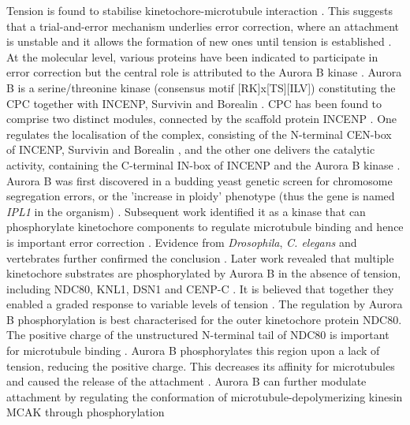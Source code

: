 Tension is found to stabilise kinetochore-microtubule interaction \citep{Nicklas1969CHROMOSOMEChromosomes}. This suggests that a trial-and-error mechanism underlies error correction, where an attachment is unstable and it allows the formation of new ones until tension is established \citep{Nicklas1997HowChromosomes, Tanaka2010Kinetochore-microtubuleBi-orientation, Krenn2015TheSignaling}. At the molecular level, various proteins have been indicated to participate in error correction \citep{Tanaka2022SWAPCorrection} but the central role is attributed to the Aurora B kinase \citep{Krenn2015TheSignaling, Lampson2011SensingFunction, McVey2021AuroraSegregation, Hindriksen2017TheLocalization}. Aurora B is a serine/threonine kinase (consensus motif [RK]x[TS][ILV]) \citep{Cheeseman2002Phospho-regulationIpl1p, Francisco1994TypeSegregation} constituting the CPC together with INCENP, Survivin and Borealin \citep{Gassmann2004BorealinSpindle, Romano2003CSC-1ICP-1, Cooke1987TheMitosis.}. CPC has been found to comprise two distinct modules, connected by the scaffold protein INCENP \citep{Carmena2012TheMitosis}. One regulates the localisation of the complex, consisting of the N-terminal CEN-box of INCENP, Survivin and Borealin \citep{Jeyaprakash2011StructuralComplex, Jeyaprakash2007StructureTogether}, and the other one delivers the catalytic activity, containing the C-terminal IN-box of INCENP and the Aurora B kinase \citep{Kang2001FunctionalSegregation, Bishop2002PhosphorylationActivity, Sessa2005MechanismHesperadin}. Aurora B was first discovered in a budding yeast genetic screen for chromosome segregation errors, or the 'increase in ploidy' phenotype (thus the gene is named \textit{IPL1} in the organism) \citep{Chan1993IsolationYeast.}. Subsequent work identified it as a kinase that can phosphorylate kinetochore components to regulate microtubule binding and hence is important error correction \citep{Cheeseman2002Phospho-regulationIpl1p, Francisco1994TypeSegregation, Biggins1999TheYeast, Tanaka2002EvidenceConnections}. Evidence from \textit{Drosophila}, \textit{C. elegans} and vertebrates further confirmed the conclusion \citep{Giet1999Aurora/Ipl1p-relatedKinases}. Later work revealed that multiple kinetochore substrates are phosphorylated by Aurora B in the absence of tension, including NDC80, KNL1, DSN1 and CENP-C \citep{DeLuca2006KinetochoreHec1, Welburn2010AuroraInterface, Zhou2017PhosphorylationMitosis, Bonner2019EnrichmentAssembly}. It is believed that together they enabled a graded response to variable levels of tension \citep{Welburn2010AuroraInterface}. The regulation by Aurora B phosphorylation is best characterised for the outer kinetochore protein NDC80. The positive charge of the unstructured N-terminal tail of NDC80 is important for microtubule binding \citep{Ciferri2008ImplicationsComplex, Wei2006StructureDomain, Umbreit2012TheDynamics}. Aurora B phosphorylates this region upon a lack of tension, reducing the positive charge. This decreases its affinity for microtubules and caused the release of the attachment \citep{DeLuca2006KinetochoreHec1, DeLuca2011TemporalMitosis, Ciferri2008ImplicationsComplex, Cheeseman2006TheKinetochore}. Aurora B can further modulate attachment by regulating the conformation of microtubule-depolymerizing kinesin MCAK through phosphorylation 